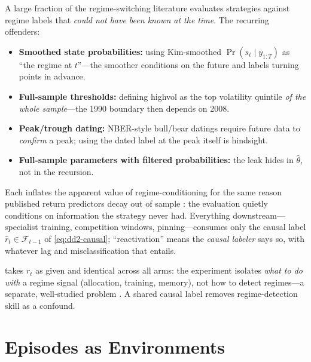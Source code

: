 \begin{warning}[title={Label leakage: the classic regime-paper sin}]
A large fraction of the regime-switching literature evaluates strategies
against regime labels that \emph{could not have been known at the time}. The
recurring offenders:
\begin{itemize}
  \item \textbf{Smoothed state probabilities:} using Kim-smoothed
        $\Pr(s_t \mid y_{1:T})$ as ``the regime at $t$''---the smoother
        conditions on the future and labels turning points in advance.
  \item \textbf{Full-sample thresholds:} defining \textsf{highvol} as the
        top volatility quintile \emph{of the whole sample}---the 1990
        boundary then depends on 2008.
  \item \textbf{Peak/trough dating:} NBER-style bull/bear datings require
        future data to \emph{confirm} a peak; using the dated label at the
        peak itself is hindsight.
  \item \textbf{Full-sample parameters with filtered probabilities:} the
        leak hides in $\hat\theta$, not in the recursion.
\end{itemize}
Each inflates the apparent value of regime-conditioning for the same reason
published return predictors decay out of sample \citep{mclean2016does}: the
evaluation quietly conditions on information the strategy never had.
Everything downstream---specialist training, competition windows,
pinning---consumes only the causal label
$\hat r_t \in \mathcal{F}_{t-1}$ of \eqref{eq:dd2-causal}; ``reactivation''
means the \emph{causal labeler} says so, with whatever lag and
misclassification that entails.
\end{warning}

\begin{remark}
\nm{} takes $\hat r_t$ as given and identical across all arms: the
experiment isolates \emph{what to do with} a regime signal (allocation,
training, memory), not how to detect regimes---a separate, well-studied
problem \citep{nystrup2018dynamic, nystrup2020greedy}. A shared causal label
removes regime-detection skill as a confound.
\end{remark}

\section{Episodes as Environments}
\label{sec:dd2-episodes}

